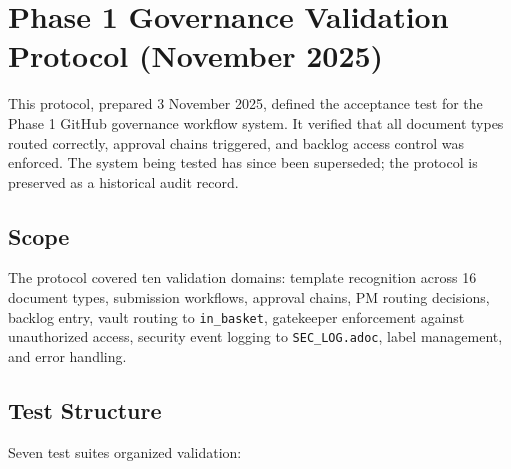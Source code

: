 
\section{Phase 1 Governance Validation Protocol (November 2025)}

This protocol, prepared 3 November 2025, defined the acceptance test
for the Phase 1 GitHub governance workflow system. It verified that all
document types routed correctly, approval chains triggered, and backlog
access control was enforced. The system being tested has since been
superseded; the protocol is preserved as a historical audit record.

\subsection{Scope}

The protocol covered ten validation domains: template recognition across
16 document types, submission workflows, approval chains, PM routing
decisions, backlog entry, vault routing to \texttt{in\_basket}, gatekeeper
enforcement against unauthorized access, security event logging to
\texttt{SEC\_LOG.adoc}, label management, and error handling.

\subsection{Test Structure}

Seven test suites organized validation:


